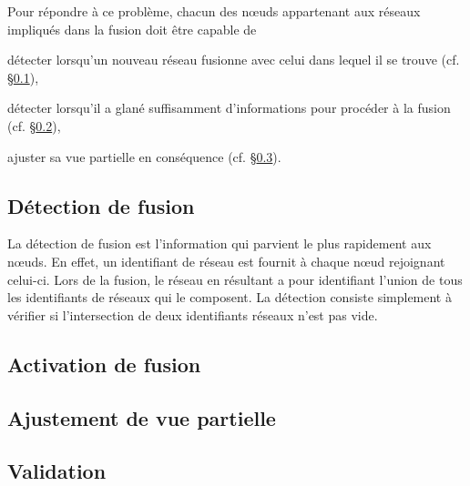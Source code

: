 Pour répondre à ce problème, chacun des nœuds appartenant aux réseaux impliqués
dans la fusion doit être capable de
\begin{inparaenum}[(i)]
\item détecter lorsqu'un nouveau réseau fusionne avec celui dans lequel il se
  trouve (cf. §\ref{net:subsec:detection}),
\item détecter lorsqu'il a glané suffisamment d'informations pour procéder à la
  fusion (cf. §\ref{net:subsec:activation}),
\item ajuster sa vue partielle en conséquence (cf. §\ref{net:subsec:merging}).
\end{inparaenum}


\subsection{Détection de fusion}
\label{net:subsec:detection}

La détection de fusion est l'information qui parvient le plus rapidement aux
nœuds. En effet, un identifiant de réseau est fournit à chaque nœud rejoignant
celui-ci. Lors de la fusion, le réseau en résultant a pour identifiant l'union
de tous les identifiants de réseaux qui le composent. La détection consiste
simplement à vérifier si l'intersection de deux identifiants réseaux n'est pas
vide.

\subsection{Activation de fusion}
\label{net:subsec:activation}

\subsection{Ajustement de vue partielle}
\label{net:subsec:merging}

\subsection{Validation}
